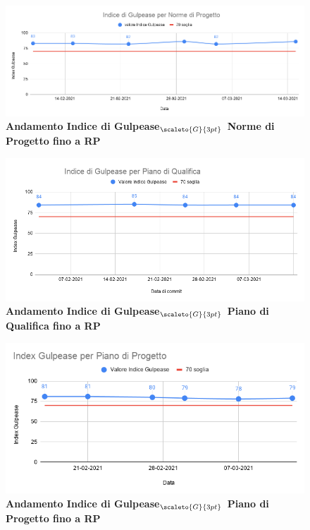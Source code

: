{{{\begin{figure}[H]
	\begin{center}
		\includegraphics[width=1\linewidth]{../immagini/gulpeaseRP/IndicediGulpeaseperNormediProgetto.png}
		\caption{\textbf{Andamento Indice di Gulpease$_{\scaleto{G}{3pt}}$ Norme di Progetto fino a RP}}
	\end{center}
\end{figure}

\begin{figure}[H]
	\begin{center}
		\includegraphics[width=0.9\linewidth]{../immagini/gulpeaseRP/indPdQ2.png}
		\caption{\textbf{Andamento Indice di Gulpease$_{\scaleto{G}{3pt}}$ Piano di Qualifica fino a RP}}
	\end{center}
\end{figure}

\begin{figure}[H]
	\begin{center}
		\includegraphics[width=0.9\linewidth]{../immagini/gulpeaseRP/indPdP2.png}
		\caption{\textbf{Andamento Indice di Gulpease$_{\scaleto{G}{3pt}}$ Piano di Progetto fino a RP}}
	\end{center}
\end{figure}

}}}
